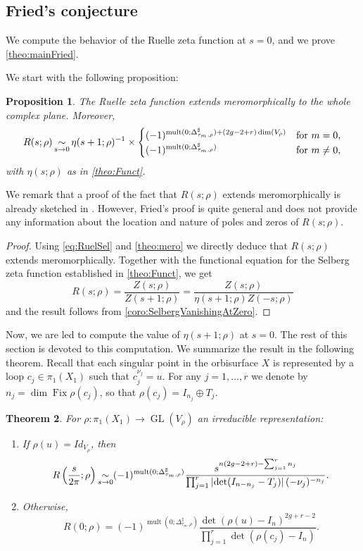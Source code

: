 \documentclass[10pt]{amsart}
\newcommand{\simm}{\mathop{\sim}\displaylimits}
\theoremstyle{plain}
\newtheorem{thm}{Theorem}[subsection]
\newtheorem{prop}[thm]{Proposition}
\theoremstyle{definition}
\theoremstyle{remark}
\DeclareMathOperator{\GL}{GL}
\DeclareMathOperator{\Fix}{Fix}
\numberwithin{equation}{section}
\DeclareMathOperator{\mult}{mult}
\begin{document}
\subsection{Fried's conjecture}
\label{subsec:Fried}
We compute the behavior of the Ruelle zeta function at $s=0$, and we prove \cref{theo:mainFried}.


We start with the following proposition:
\begin{prop}\label{prop:RuelleVsEtaAtZero}
The Ruelle zeta function extends meromorphically to the whole complex plane. Moreover,
\[
R(s; \rho) \simm_{s \to 0} \eta(s+1;\rho)^{-1}\times\begin{cases}(-1)^{\mult(0;\Delta_{\tau_m,\rho}^\sharp)+(2g-2+r)\dim(V_\rho)}&\mbox{for $m=0$,}\\(-1)^{\mult(0;\Delta_{\tau_m,\rho}^\sharp)}&\mbox{for $m\neq0$,}\end{cases}
\]
with $\eta(s;\rho)$ as in \cref{theo:Funct}.
\end{prop}

We remark that a proof of the fact that $R(s;\rho)$ extends meromorphically is already sketched in \cite[Th.\,1]{fried1986fuchsian}. However, Fried's proof is quite general and does not provide any information about the location and nature of poles and zeros of $R(s;\rho)$.

\begin{proof}
Using \cref{eq:RuelSel} and \cref{theo:mero} we directly deduce that $R(s; \rho)$ extends meromorphically. Together with the functional equation for the Selberg zeta function established in \cref{theo:Funct}, we get
\[
R(s; \rho) = \frac{Z(s;\rho)}{Z(s+1;\rho)} = \frac{Z(s;\rho)}{\eta(s+1;\rho) Z(-s;\rho)}
\]
and the result follows from \cref{coro:SelbergVanishingAtZero}.
\end{proof}

Now, we are led to compute the value of $\eta(s+1;\rho)$ at $s=0$. The rest of this section is devoted to this computation. We summarize the result in the following theorem. Recall that each singular point in the orbisurface $X$ is represented by a loop $c_j \in \pi_1(X_1)$ such that $c_j^{\nu_j} = u$.
For any $j=1, \ldots, r$ we denote by $n_j= \dim \Fix \rho(c_j)$, so that $\rho(c_j) = I_{n_j} \oplus T_j$.

\begin{thm}
\label{theo:Ruelle0}
For $\rho\colon \pi_1(X_1) \to \GL(V_\rho)$ an irreducible representation:
\begin{enumerate}
\item \label{item1}
If $\rho(u)= Id_{V_\rho}$, then\vspace*{-3pt}
\[
R\left(\frac{s}{2\pi}; \rho\right) \simm_{s \to 0} (-1)^{\mult(0;\Delta_{\tau_m,\rho}^\sharp)}\frac{s^{n(2g-2+r)-\sum_{j=1}^rn_j}}{\prod_{j=1}^r |{\det}(I_{n-n_j} -T_j)|\,(-\nu_j)^{-n_j}}.
\]
\item \label{item2}
Otherwise,\vspace*{-3pt}
\[
R(0;\rho) = (-1)^{\mult(0;\Delta_{\tau_m,\rho}^\sharp)}\frac{\det(\rho(u)-I_n)^{2g+r-2}}{\prod_{j=1}^r \det(\rho(c_j)-I_n)}.
\]
\end{enumerate}
\end{thm}
\end{document}
